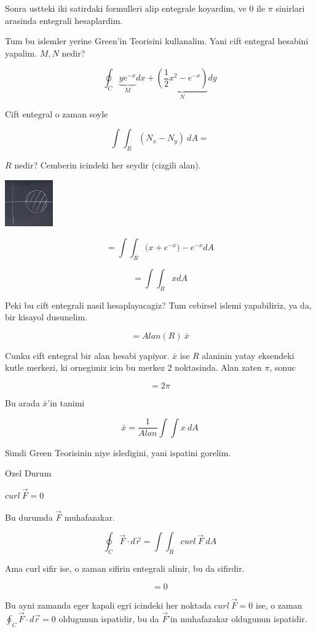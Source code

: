 \documentclass[12pt,fleqn]{article}
\begin{document}
Sonra ustteki iki satirdaki formulleri alip entegrale koyardim, ve 0 ile
$\pi$ sinirlari arasinda entegrali hesaplardim. 

Tum bu islemler yerine Green'in Teorisini kullanalim. Yani cift entegral
hesabini yapalim. $M,N$ nedir? 

\[ \oint_C 
\underbrace{ye^{-x}}_{M} dx + 
\underbrace{(\frac{1}{2}x^2 - e^{-x})}_{N}dy \]

Cift entegral o zaman soyle

\[ \int \int_R (N_x - N_y) \ dA =
\]

$R$ nedir? Cemberin icindeki her seydir (cizgili alan). 

\includegraphics[height=2cm]{22_2.png}

\[=  \int \int_R  \bigg( x+ e^{-x} \bigg) - e^{-x} dA \]

\[=  \int \int_R  x dA \]

Peki bu cift entegrali nasil hesaplayacagiz? Tum cebirsel islemi
yapabiliriz, ya da, bir kisayol dusunelim. 

\[ = Alan(R) \ \bar{x} \]

Cunku cift entegral bir alan hesabi yapiyor. $\bar{x}$ ise $R$ alaninin
yatay eksendeki kutle merkezi, ki ornegimiz icin bu merkez 2
noktasinda. Alan zaten $\pi$, sonuc

\[ = 2\pi \]

Bu arada $\bar{x}$'in tanimi

\[ \bar{x} = \frac{1}{Alan} \int \int x \ dA \]


Simdi Green Teorisinin niye isledigini, yani ispatini gorelim. 

Ozel Durum 

$curl \ \vec{F} = 0$

Bu durumda $\vec{F}$ muhafazakar. 

\[ \oint_C \vec{F} \cdot d\vec{r} = \int \int_R curl \ \vec{F} \ dA \]

Ama curl sifir ise, o zaman sifirin entegrali alinir, bu da sifirdir. 

\[ = 0 \]

Bu ayni zamanda eger kapali egri icindeki her noktada $curl \ \vec{F} = 0$ ise, o
zaman $\oint_C \vec{F} \cdot d\vec{r} = 0$ oldugunun ispatidir, bu da $\vec{F}$'in muhafazakar oldugunun
ispatidir. 
\end{document}

